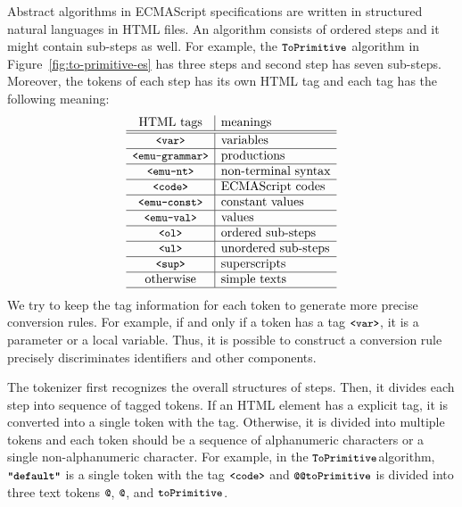 Abstract algorithms in ECMAScript specifications are written in structured
natural languages in HTML files. An algorithm consists of ordered steps
and it might contain sub-steps as well. For example,
the \( \texttt{\small ToPrimitive} \) algorithm in Figure~\ref{fig:to-primitive-es}
has three steps and second step has seven sub-steps.
Moreover, the tokens of each step has its own HTML tag and each tag
has the following meaning:
\[
  \begin{array}{c|l}
    \text{HTML tags} & \text{meanings}\\\hline\hline
    \texttt{\small<var>} & \text{variables}\\\hline
    \texttt{\small<emu-grammar>} & \text{productions}\\\hline
    \texttt{\small<emu-nt>} & \text{non-terminal syntax}\\\hline
    \texttt{\small<code>} & \text{ECMAScript codes}\\\hline
    \texttt{\small<emu-const>} & \text{constant values}\\\hline
    \texttt{\small<emu-val>} & \text{values}\\\hline
    \texttt{\small<ol>} & \text{ordered sub-steps}\\\hline
    \texttt{\small<ul>} & \text{unordered sub-steps}\\\hline
    \texttt{\small<sup>} & \text{superscripts}\\\hline
    \text{otherwise} & \text{simple texts}\\\hline
  \end{array}
\]
We try to keep the tag information for each token to generate more
precise conversion rules. For example, if and only if a token has a tag
\( \texttt{\small<var>} \), it is a parameter or a local variable.
Thus, it is possible to construct a conversion rule precisely discriminates
identifiers and other components.

The tokenizer first recognizes the overall structures of steps.
Then, it divides each step into sequence of tagged tokens.
If an HTML element has a explicit tag, it is converted into a single token
with the tag. Otherwise, it is divided into multiple tokens and each token
should be a sequence of alphanumeric characters or a single
non-alphanumeric character. For example, in the \( \texttt{\small ToPrimitive} \)algorithm,
\( \textbf{\texttt{\small"default"}} \) is a single token with the tag \( \texttt{\small<code>} \)
and \( \code{@@toPrimitive} \) is divided into three text tokens
\( \code{@} \), \( \code{@} \), and \( \texttt{\small toPrimitive} \).

